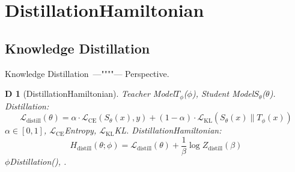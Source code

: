 \documentclass[12pt,a4paper]{article}
\newtheorem{definition}[theorem]Definition
\theoremstyle{remark}
\newcommand{\loss}{\mathcal{L}}
\begin{document}
\section{DistillationHamiltonian}
\subsection{Knowledge Distillation}
Knowledge Distillation~\cite{hinton2015distilling}---""""---
Perspective\textbf{}.
\begin{definition}[DistillationHamiltonian]
Teacher Model$T_\phi$($\phi$), Student Model$S_\theta$($\theta$).
Distillation: 
\begin{equation}\label{eq:distill_loss}
    \loss_{\text{distill}}(\theta) = \alpha \cdot \loss_{\text{CE}}(S_\theta(x), y) + (1-\alpha) \cdot \loss_{\text{KL}}(S_\theta(x) \| T_\phi(x))
\end{equation}
$\alpha \in [0,1]$, $\loss_{\text{CE}}$Entropy, $\loss_{\text{KL}}$KL.
DistillationHamiltonian: 
\begin{equation}\label{eq:distill_hamiltonian}
    H_{\text{distill}}(\theta; \phi) = \loss_{\text{distill}}(\theta) + \frac{1}{\beta} \log Z_{\text{distill}}(\beta)
\end{equation}
$\phi$Distillation\textbf{}(), .
\end{definition}
\end{document}
